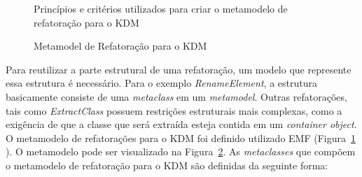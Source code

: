 \begin{figure}[!h]
 \centering
\caption{Princípios e critérios utilizados para criar o metamodelo de refatoração para o KDM}
 \label{fig:processoDOMETAMODELO}
\end{figure}

\begin{figure}[h]
 \centering
\caption{Metamodel de Refatoração para o KDM}
 \label{fig:METAMODELO}
\end{figure}

Para reutilizar a parte estrutural de uma refatoração, um modelo que represente essa estrutura é necessário. Para o exemplo \textit{RenameElement}, a estrutura basicamente consiste de uma \textit{metaclass} em um \textit{metamodel}. Outras refatorações, tais como \textit{ExtractClass} possuem restrições estruturais mais complexas, como a exigência de que a classe que será extraída esteja contida em um \textit{container object}. O metamodelo de refatorações para o KDM foi definido utilizado EMF (Figura~\ref{fig:processoDOMETAMODELO} ). O metamodelo pode ser visualizado na Figura~\ref{fig:METAMODELO}. As \textit{metaclasses} que compõem o metamodelo de refatoração para o KDM são definidas da seguinte forma:
 
